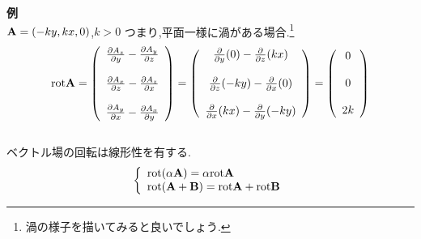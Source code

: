 \documentclass[../main]{subfiles}
\begin{document}
{\bf 例} \\
${\bf A} = (-ky,kx,0)$,$k>0$ つまり,平面一様に渦がある場合.\footnote{渦の様子を描いてみると良いでしょう.} 
\begin{eqnarray}
{\rm rot}{\bf A} =  
\left( 
\begin{array}{cc}
\frac{\partial A_z}{\partial y}-\frac{\partial A_y}{\partial z}\\
\\
\frac{\partial A_x}{\partial z}-\frac{\partial A_z}{\partial x}\\
\\
\frac{\partial A_y}{\partial x}-\frac{\partial A_x}{\partial y}\\
\end{array}
\right)
=
\left( 
\begin{array}{cc}
\frac{\partial}{\partial y}(0)-\frac{\partial}{\partial z}(kx)\\
\\
\frac{\partial}{\partial z}(-ky)-\frac{\partial}{\partial x}(0)\\
\\
\frac{\partial}{\partial x}(kx)-\frac{\partial}{\partial y}(-ky)\\
\end{array}
\right)
=
\left( 
\begin{array}{cc}
0 \\
\\
0 \\
\\
2k \\
\end{array}
\right)
\end{eqnarray}
\\
ベクトル場の回転は線形性を有する.
\begin{equation}
\left \{
\begin{array}{l}
{\rm rot}(\alpha {\bf A}) = \alpha {\rm rot}{\bf A} \\
{\rm rot}({\bf A}+{\bf B}) = {\rm rot}{\bf A} + {\rm rot}{\bf B}
\end{array}
\right.
\end{equation}
\end{document}
